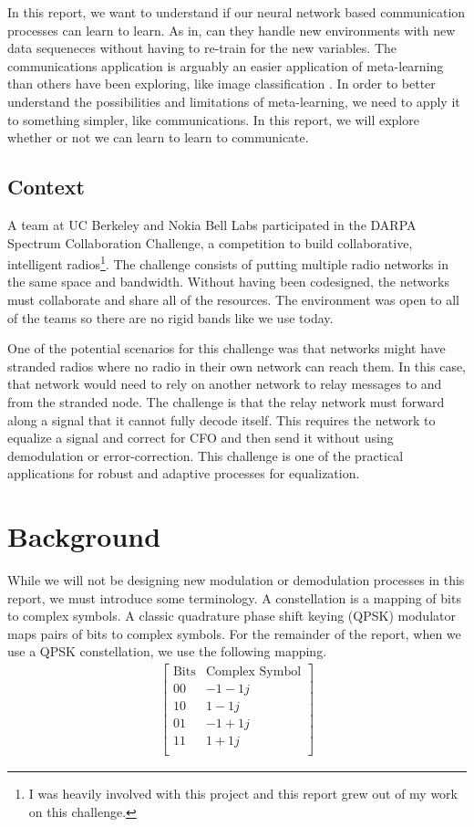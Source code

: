 In this report, we want to understand if our neural network based communication processes can learn to learn.  
As in, can they handle new environments with new data sequeneces without having to re-train for the new variables. 
The communications application is arguably an easier application of meta-learning than others have been exploring, like image classification \cite{khodadadeh}.  
In order to better understand the possibilities and limitations of meta-learning, we need to apply it to something simpler, like communications.  In this report, we will explore whether or not we can learn to learn to communicate. 

\subsection{Context}

A team at UC Berkeley and Nokia Bell Labs  participated in the DARPA Spectrum Collaboration Challenge, a competition to build collaborative, intelligent radios\footnote{I was heavily involved with this project and this report grew out of my work on this challenge.}.
The challenge consists of putting multiple radio networks in the same space and bandwidth.  
Without having been codesigned, the networks must collaborate and share all of the resources.
The environment was open to all of the teams so there are no rigid bands like we use today.

One of the potential scenarios for this challenge was that networks might have stranded radios where no radio in their own network can reach them.  In this case, that network would need to rely on another network to relay messages to and from the stranded node.  
The challenge is that the relay network must forward along a signal that it cannot fully decode itself.  This requires the network to equalize a signal and correct for CFO and then send it without using demodulation or error-correction.  
This challenge is one of the practical applications for robust and adaptive processes for equalization.

\section{Background}

While we will not be designing new modulation or demodulation processes in this report, we must introduce some terminology.
A constellation is a mapping of bits to complex symbols.  
A classic quadrature phase shift keying (QPSK) modulator maps pairs of bits to complex symbols.
For the remainder of the report, when we use a QPSK constellation, we use the following mapping.
\begin{align*}
\begin{bmatrix}
\text{Bits} & \text{Complex Symbol} \\
\hline
00 & -1-1j \\
10 & 1 -1j \\
01 & -1 + 1j \\
11 & 1+1j \\
\end{bmatrix}
\end{align*}

